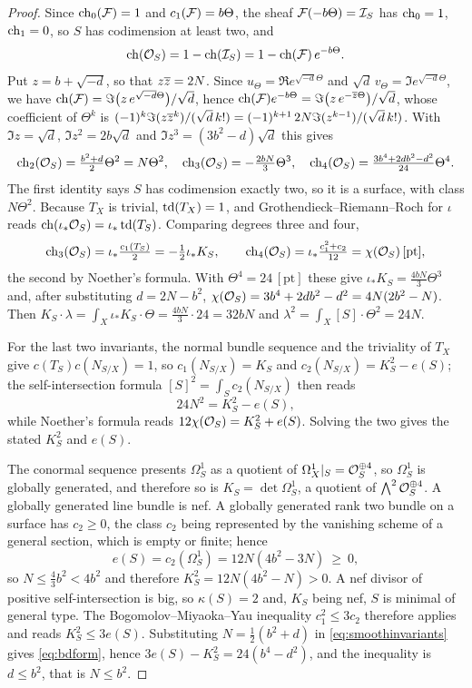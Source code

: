 \begin{proof}
Since $\operatorname{ch}_{0}(\mathcal{F})=1$ and $c_{1}(\mathcal{F})=b\Theta$, the sheaf
$\mathcal{F}(-b\Theta)=\mathcal{I}_{S}$ has $\operatorname{ch}_{0}=1$, $\operatorname{ch}_{1}=0$, so $S$ has codimension
at least two, and
\[
  \operatorname{ch}(\mathcal{O}_{S})=1-\operatorname{ch}(\mathcal{I}_{S})=1-\operatorname{ch}(\mathcal{F})\,e^{-b\Theta}.
\]
Put $z=b+\sqrt{-d}$, so that $z\overline{z}=2N$. Since
$u_{\Theta}=\Re e^{\sqrt{-d}\Theta}$ and
$\sqrt d\,v_{\Theta}=\Im e^{\sqrt{-d}\Theta}$, we have
$\operatorname{ch}(\mathcal{F})=\Im\bigl(z\,e^{\sqrt{-d}\Theta}\bigr)/\sqrt d$, hence
$\operatorname{ch}(\mathcal{F})e^{-b\Theta}=\Im\bigl(z\,e^{-\overline{z}\Theta}\bigr)/\sqrt d$, whose
coefficient of $\Theta^{k}$ is
$(-1)^{k}\Im(z\overline{z}^{k})/(\sqrt d\,k!)=(-1)^{k+1}\,2N\Im(z^{k-1})/(\sqrt d\,k!)$.
With $\Im z=\sqrt d$, $\Im z^{2}=2b\sqrt d$ and
$\Im z^{3}=(3b^{2}-d)\sqrt d$ this gives
\[
  \operatorname{ch}_{2}(\mathcal{O}_{S})=\tfrac{b^{2}+d}{2}\Theta^{2}=N\Theta^{2},\quad
  \operatorname{ch}_{3}(\mathcal{O}_{S})=-\tfrac{2bN}{3}\Theta^{3},\quad
  \operatorname{ch}_{4}(\mathcal{O}_{S})=\tfrac{3b^{4}+2db^{2}-d^{2}}{24}\Theta^{4}.
\]
The first
identity says $S$ has codimension exactly two, so it is a surface, with class
$N\Theta^{2}$. Because $T_{X}$ is trivial, $\operatorname{td}(T_{X})=1$, and
Grothendieck--Riemann--Roch for $\iota$ reads
$\operatorname{ch}(\iota_{*}\mathcal{O}_{S})=\iota_{*}\operatorname{td}(T_{S})$. Comparing degrees three and four,
\[
  \operatorname{ch}_{3}(\mathcal{O}_{S})=\iota_{*}\tfrac{c_{1}(T_{S})}{2}=-\tfrac12\iota_{*}K_{S},
  \qquad
  \operatorname{ch}_{4}(\mathcal{O}_{S})=\iota_{*}\tfrac{c_{1}^{2}+c_{2}}{12}
  =\chi(\mathcal{O}_{S})\,[\mathrm{pt}],
\]
the second by Noether's formula. With $\Theta^{4}=24\,[\mathrm{pt}]$ these give
$\iota_{*}K_{S}=\tfrac{4bN}{3}\Theta^{3}$ and, after substituting
$d=2N-b^{2}$, $\chi(\mathcal{O}_{S})=3b^{4}+2db^{2}-d^{2}=4N(2b^{2}-N)$.
Then $K_{S}\cdot\lambda=\int_{X}\iota_{*}K_{S}\cdot\Theta=\tfrac{4bN}{3}\cdot24=32bN$
and $\lambda^{2}=\int_{X}[S]\cdot\Theta^{2}=24N$.

For the last two invariants, the normal bundle sequence and the triviality of
$T_{X}$ give $c(T_{S})c(N_{S/X})=1$, so $c_{1}(N_{S/X})=K_{S}$ and
$c_{2}(N_{S/X})=K_{S}^{2}-e(S)$; the self-intersection formula
$[S]^{2}=\int_{S}c_{2}(N_{S/X})$ then reads
\[
  24N^{2}=K_{S}^{2}-e(S),
\]
while Noether's formula reads $12\chi(\mathcal{O}_{S})=K_{S}^{2}+e(S)$. Solving the
two gives the stated $K_{S}^{2}$ and $e(S)$.

The conormal sequence presents $\Omega^{1}_{S}$ as a quotient of
$\Omega^{1}_{X}|_{S}=\mathcal{O}_{S}^{\oplus4}$, so $\Omega^{1}_{S}$ is globally
generated, and therefore so is $K_{S}=\det\Omega^{1}_{S}$, a quotient of
$\bigwedge^{2}\mathcal{O}_{S}^{\oplus4}$. A globally generated line bundle is nef. A
globally generated rank two bundle on a surface has $c_{2}\ge0$, the class
$c_{2}$ being represented by the vanishing scheme of a general section, which
is empty or finite; hence
\[
  e(S)=c_{2}(\Omega^{1}_{S})=12N(4b^{2}-3N)\ \ge\ 0,
\]
so $N\le\tfrac43b^{2}<4b^{2}$ and therefore $K_{S}^{2}=12N(4b^{2}-N)>0$. A nef
divisor of positive self-intersection is big, so $\kappa(S)=2$ and, $K_{S}$
being nef, $S$ is minimal of general type. The Bogomolov--Miyaoka--Yau
inequality $c_{1}^{2}\le3c_{2}$ therefore applies and reads
$K_{S}^{2}\le3e(S)$. Substituting $N=\tfrac12(b^{2}+d)$ in
\eqref{eq:smoothinvariants} gives \eqref{eq:bdform}, hence
$3e(S)-K_{S}^{2}=24(b^{4}-d^{2})$, and the inequality is $d\le b^{2}$, that
is $N\le b^{2}$.


\end{proof}
